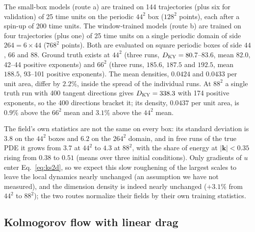 The small-box models (route a) are trained on 144 trajectories (plus six
for validation) of 25 time units on the periodic $44^2$ box ($128^2$
points), each after a spin-up of 200 time units. The window-trained
models (route b) are trained on four trajectories (plus one) of 25 time
units on a single periodic domain of side $264=6\times44$ ($768^2$
points). Both are evaluated on square periodic boxes of side $44$, $66$
and $88$. Ground truth exists at $44^2$ (three runs, $D_{\mathrm{KY}}=80.7$--$83.6$,
mean $82.0$, 42--44 positive exponents) and $66^2$ (three runs, $185.6$, $187.5$ and
$192.5$, mean $188.5$, 93--101 positive exponents). The
mean densities, $0.0424$ and $0.0433$ per unit area, differ by $2.2\%$,
inside the spread of the individual runs. At $88^2$ a single truth run with 400
tangent directions gives $D_{\mathrm{KY}}=338.3$ with 174 positive exponents, so
the 400 directions bracket it; its density, $0.0437$ per unit area, is
$0.9\%$ above the $66^2$ mean and $3.1\%$ above the $44^2$ mean.

The field's own statistics are not the same on every box: its standard
deviation is $3.8$ on the $44^2$ boxes and $6.2$ on the $264^2$ domain,
and in free runs of the true PDE it grows from $3.7$ at $44^2$ to $4.3$ at
$88^2$, with the share of energy at $|\bm k|<0.35$ rising from $0.38$ to
$0.51$ (means over three initial conditions). Only gradients of $u$ enter
Eq.~\eqref{eq:ks2d}, so we expect this slow roughening of the largest scales
\citep[the long-wavelength roughening studied by][]{jayaprakash1993}
to leave the local dynamics nearly unchanged (an assumption we have not
measured), and the dimension density is indeed nearly unchanged ($+3.1\%$ from $44^2$ to $88^2$); the two routes normalize their fields by their own training
statistics.

\subsection{Kolmogorov flow with linear drag}
\label{sec:kolmogorov}

